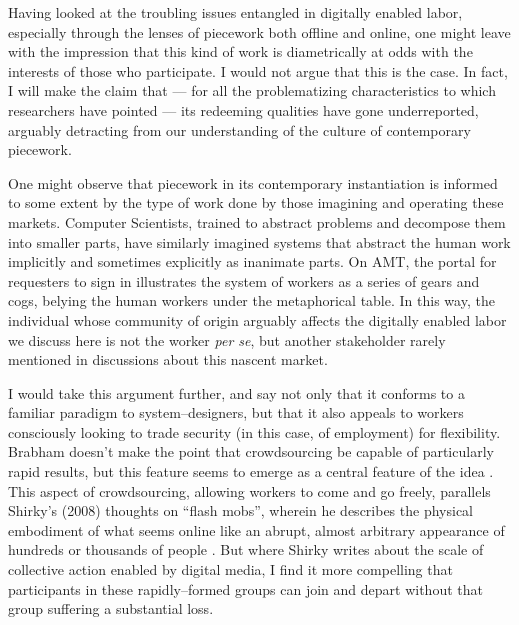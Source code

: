 \documentclass[11pt]{article}
\begin{document}
Having looked at the troubling issues entangled in digitally enabled labor, especially through the lenses of piecework both offline and online, one might leave with the impression that this kind of work is diametrically at odds with the interests of those who participate.
I would not argue that this is the case.
In fact, I will make the claim that
--- for all the problematizing characteristics to which researchers have pointed ---
its redeeming qualities have gone underreported, arguably detracting from our understanding of the culture of contemporary piecework.

One might observe that piecework in its contemporary instantiation is informed to some extent by the type of work done by those imagining and operating these markets.
Computer Scientists, trained to abstract problems and decompose them into smaller parts, have similarly imagined systems that abstract the human work implicitly and sometimes explicitly as inanimate parts.
On AMT, the portal for requesters to sign in illustrates the system of workers as a series of gears and cogs, belying the human workers under the metaphorical table.
In this way, the individual whose community of origin arguably affects the digitally enabled labor we discuss here is not the worker \textit{per se}, but another stakeholder rarely mentioned in discussions about this nascent market.

I would take this argument further, and say not only that it conforms to a familiar paradigm to system--designers, but that it also appeals to workers consciously looking to trade security (in this case, of employment) for flexibility.
Brabham doesn't make the point that crowdsourcing be capable of particularly rapid results, but this feature seems to emerge as a central feature of the idea
\cite{foundry}.
This aspect of crowdsourcing, allowing workers to come and go freely, parallels Shirky's (2008) thoughts on ``flash mobs'', wherein he describes the physical embodiment of what seems online like an abrupt, almost arbitrary appearance of hundreds or thousands of people
\cite{shirky2008here}.
But where Shirky writes about the scale of collective action enabled by digital media,
I find it more compelling that participants in these rapidly--formed groups can join and depart without that group suffering a substantial loss.
\end{document}
